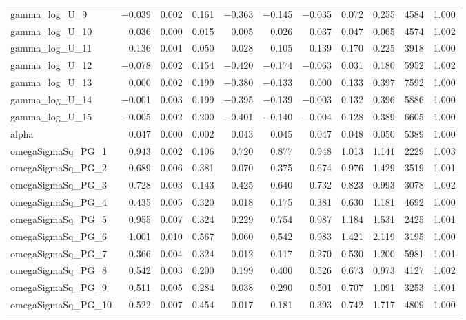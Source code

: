 \documentclass[12pt]{article}
\begin{document}
\begin{longtable}{lrrrrrrrrrr}
gamma\_log\_U\_9  & $-$0.039 & 0.002 & 0.161 & $-$0.363 & $-$0.145 & $-$0.035 &  0.072 &  0.255 &  4584 & 1.000 \\
gamma\_log\_U\_10 &  0.036 & 0.000 & 0.015 &  0.005 &  0.026 &  0.037 &  0.047 &  0.065 &  4574 & 1.002 \\
gamma\_log\_U\_11 &  0.136 & 0.001 & 0.050 &  0.028 &  0.105 &  0.139 &  0.170 &  0.225 &  3918 & 1.000 \\
gamma\_log\_U\_12 & $-$0.078 & 0.002 & 0.154 & $-$0.420 & $-$0.174 & $-$0.063 &  0.031 &  0.180 &  5952 & 1.002 \\
gamma\_log\_U\_13 &  0.000 & 0.002 & 0.199 & $-$0.380 & $-$0.133 &  0.000 &  0.133 &  0.397 &  7592 & 1.000 \\
gamma\_log\_U\_14 & $-$0.001 & 0.003 & 0.199 & $-$0.395 & $-$0.139 & $-$0.003 &  0.132 &  0.396 &  5886 & 1.000 \\
gamma\_log\_U\_15 & $-$0.005 & 0.002 & 0.200 & $-$0.401 & $-$0.140 & $-$0.004 &  0.128 &  0.389 &  6605 & 1.000 \\
\addlinespace
alpha & 0.047 & 0.000 & 0.002 & 0.043 & 0.045 & 0.047 & 0.048 & 0.050 & 5389 & 1.000 \\
\addlinespace
omegaSigmaSq\_PG\_1  & 0.943 & 0.002 & 0.106 & 0.720 & 0.877 & 0.948 & 1.013 & 1.141 &  2229 & 1.003 \\
omegaSigmaSq\_PG\_2  & 0.689 & 0.006 & 0.381 & 0.070 & 0.375 & 0.674 & 0.976 & 1.429 &  3519 & 1.001 \\
omegaSigmaSq\_PG\_3  & 0.728 & 0.003 & 0.143 & 0.425 & 0.640 & 0.732 & 0.823 & 0.993 &  3078 & 1.002 \\
omegaSigmaSq\_PG\_4  & 0.435 & 0.005 & 0.320 & 0.018 & 0.175 & 0.381 & 0.630 & 1.181 &  4692 & 1.000 \\
omegaSigmaSq\_PG\_5  & 0.955 & 0.007 & 0.324 & 0.229 & 0.754 & 0.987 & 1.184 & 1.531 &  2425 & 1.001 \\
omegaSigmaSq\_PG\_6  & 1.001 & 0.010 & 0.567 & 0.060 & 0.542 & 0.983 & 1.421 & 2.119 &  3195 & 1.000 \\
omegaSigmaSq\_PG\_7  & 0.366 & 0.004 & 0.324 & 0.012 & 0.117 & 0.270 & 0.530 & 1.200 &  5981 & 1.001 \\
omegaSigmaSq\_PG\_8  & 0.542 & 0.003 & 0.200 & 0.199 & 0.400 & 0.526 & 0.673 & 0.973 &  4127 & 1.002 \\
omegaSigmaSq\_PG\_9  & 0.511 & 0.005 & 0.284 & 0.038 & 0.290 & 0.501 & 0.707 & 1.091 &  3253 & 1.001 \\
omegaSigmaSq\_PG\_10 & 0.522 & 0.007 & 0.454 & 0.017 & 0.181 & 0.393 & 0.742 & 1.717 &  4809 & 1.000 \\

\end{longtable}
\end{document}
